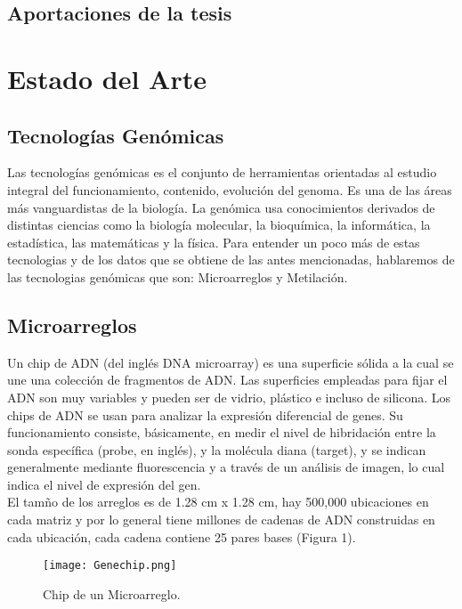 \documentclass[12pt,letterpaper]{article}
\begin{document}
\subsection{Aportaciones de la tesis}
\section{Estado del Arte}

\subsection{Tecnologías Genómicas}

Las tecnologías genómicas es el conjunto de herramientas orientadas al estudio integral del funcionamiento, contenido,  evolución del genoma. Es una de las áreas más vanguardistas de la biología. La genómica usa conocimientos derivados de distintas ciencias como la biología molecular, la bioquímica, la informática, la estadística, las matemáticas y la física.
Para entender un poco más de estas tecnologias y de los datos que se obtiene de las antes mencionadas, hablaremos de las tecnologias genómicas que son: Microarreglos y Metilación.

\subsection{Microarreglos}
Un chip de ADN (del inglés DNA microarray) es una superficie sólida a la cual se une una colección de fragmentos de ADN. Las superficies empleadas para fijar el ADN son muy variables y pueden ser de vidrio, plástico e incluso de silicona. Los chips de ADN se usan para analizar la expresión diferencial de genes.  Su funcionamiento consiste, básicamente, en medir el nivel de hibridación entre la sonda específica (probe, en inglés), y la molécula diana (target), y se indican generalmente mediante fluorescencia y a través de un análisis de imagen, lo cual indica el nivel de expresión del gen.	\\

El tamño de los arreglos es de 1.28 cm x 1.28 cm, hay 500,000 ubicaciones en cada matriz y por lo general tiene millones de cadenas de ADN construidas en cada ubicación, cada cadena contiene 25 pares bases (Figura 1).

\begin{figure}[h]
\begin{center}
\texttt{[image: Genechip.png]}
\end{center}
\caption{Chip de un Microarreglo.}
\end{figure}
\end{document}
